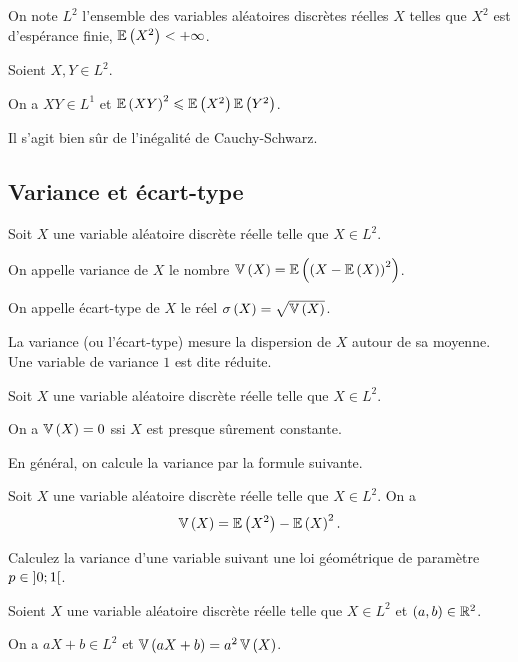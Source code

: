 On note \(L^2\) l'ensemble des variables aléatoires discrètes réelles \(X\) telles que \(X^2\) est d'espérance finie, \ie \(\operatorname{\mathbb{E}}\left(X^2\right)<+\infty\).

\begin{prop}
Soient \(X,Y\in L^2\).

On a \(XY\in L^1\) et \(\operatorname{\mathbb{E}}\left(XY\right)^2\leqslant\operatorname{\mathbb{E}}\left(X^2\right)\operatorname{\mathbb{E}}\left(Y^2\right)\).
\end{prop}

Il s'agit bien sûr de l'inégalité de Cauchy-Schwarz.

\subsection{Variance et écart-type}

\begin{defi}
Soit \(X\) une variable aléatoire discrète réelle telle que \(X\in L^2\).

On appelle variance de \(X\) le nombre \(\operatorname{\mathbb{V}}\left(X\right)=\operatorname{\mathbb{E}}\left(\left(X-\operatorname{\mathbb{E}}\left(X\right)\right)^2\right)\).

On appelle écart-type de \(X\) le réel \(\sigma\left(X\right)=\sqrt{\operatorname{\mathbb{V}}\left(X\right)}\).
\end{defi}

La variance (ou l'écart-type) mesure la dispersion de \(X\) autour de sa moyenne. Une variable de variance \(1\) est dite réduite.

\begin{prop}
Soit \(X\) une variable aléatoire discrète réelle telle que \(X\in L^2\).

On a \(\operatorname{\mathbb{V}}\left(X\right)=0\) ssi \(X\) est presque sûrement constante.
\end{prop}

En général, on calcule la variance par la formule suivante.

\begin{prop}
Soit \(X\) une variable aléatoire discrète réelle telle que \(X\in L^2\). On a \[\operatorname{\mathbb{V}}\left(X\right)=\operatorname{\mathbb{E}}\left(X^2\right)-\operatorname{\mathbb{E}}\left(X\right)^2.\]
\end{prop}

\begin{exo}
Calculez la variance d'une variable suivant une loi géométrique de paramètre \(p\in\left]0;1\right[\).
\end{exo}

\begin{prop}
Soient \(X\) une variable aléatoire discrète réelle telle que \(X\in L^2\) et \(\left(a,b\right)\in\mathbb{R}^2\).

On a \(aX+b\in L^2\) et \(\operatorname{\mathbb{V}}\left(aX+b\right)=a^2\operatorname{\mathbb{V}}\left(X\right)\).
\end{prop}

